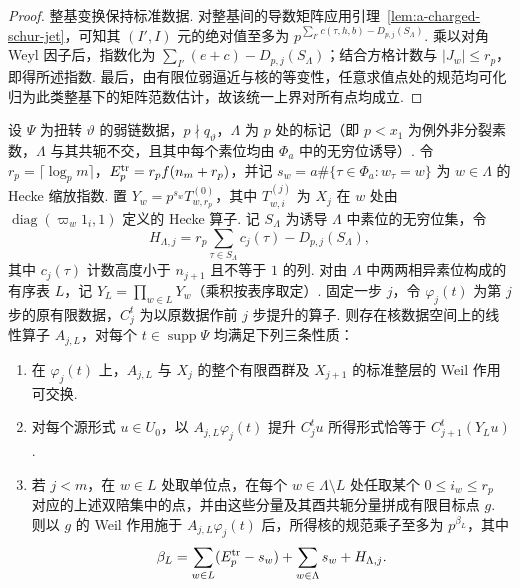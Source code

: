 \begin{proof}
整基变换保持标准数据. 对整基间的导数矩阵应用引理~\ref{lem:a-charged-schur-jet}，可知其 $(I',I)$ 元的绝对值至多为 $p^{\sum_{I'}c(\tau,h,b)-D_{p,j}(S_\Lambda)}$. 乘以对角 Weyl 因子后，指数化为 $\sum_{I'}(e+c)-D_{p,j}(S_\Lambda)$；结合方格计数与 $|J_w|\le r_p$，即得所述指数. 最后，由有限位弱逼近与核的等变性，任意求值点处的规范均可化归为此类整基下的矩阵范数估计，故该统一上界对所有点均成立.
\end{proof}

\begin{lemma}
\label{lem:a-marked-hecke-datum-transfer}
\emitthmsource
设 $\Psi$ 为扭转 $\vartheta$ 的弱链数据，$p\nmid q_\vartheta$，$\Lambda$ 为 $p$ 处的标记（即 $p<x_1$ 为例外非分裂素数，$\Lambda$ 与其共轭不交，且其中每个素位均由 $\Phi_a$ 中的无穷位诱导）. 令 $r_p=\lceil\log_p m\rceil$，$E_p^{\rm tr}=r_p f(n_m+r_p)$，并记 $s_w=a\#\{\tau\in\Phi_a:w_\tau=w\}$ 为 $w\in\Lambda$ 的 Hecke 缩放指数. 置 $Y_w=p^{s_w}T_{w,r_p}^{(0)}$，其中 $T_{w,i}^{(j)}$ 为 $X_j$ 在 $w$ 处由 $\operatorname{diag}(\varpi_w1_i,1)$ 定义的 Hecke 算子. 记 $S_\Lambda$ 为诱导 $\Lambda$ 中素位的无穷位集，令
\[
 H_{\Lambda,j}
   =r_p\sum_{\tau\in S_\Lambda}c_j(\tau)-D_{p,j}(S_\Lambda),
\]
其中 $c_j(\tau)$ 计数高度小于 $n_{j+1}$ 且不等于 $1$ 的列. 对由 $\Lambda$ 中两两相异素位构成的有序表 $L$，记 $Y_L=\prod_{w\in L}Y_w$（乘积按表序取定）. 固定一步 $j$，令 $\varphi_j(t)$ 为第 $j$ 步的原有限数据，$C_j^t$ 为以原数据作前 $j$ 步提升的算子. 则存在核数据空间上的线性算子 $A_{j,L}$，对每个 $t\in\operatorname{supp}\Psi$ 均满足下列三条性质：
\begin{enumerate}
\item 在 $\varphi_j(t)$ 上，$A_{j,L}$ 与 $X_j$ 的整个有限酉群及 $X_{j+1}$ 的标准整层的 Weil 作用可交换.
\item 对每个源形式 $u\in U_0$，以 $A_{j,L}\varphi_j(t)$ 提升 $C_j^t u$ 所得形式恰等于 $C_{j+1}^t(Y_Lu)$.
\item 若 $j<m$，在 $w\in L$ 处取单位点，在每个 $w\in\Lambda\setminus L$ 处任取某个 $0\le i_w\le r_p$ 对应的上述双陪集中的点，并由这些分量及其酉共轭分量拼成有限目标点 $g$. 则以 $g$ 的 Weil 作用施于 $A_{j,L}\varphi_j(t)$ 后，所得核的规范乘子至多为 $p^{\beta_L}$，其中
\[
  \beta_L=\sum_{w\in L}(E_p^{\rm tr}-s_w)
                +\sum_{w\in\Lambda}s_w+H_{\Lambda,j}.
\]
\end{enumerate}
\end{lemma}
